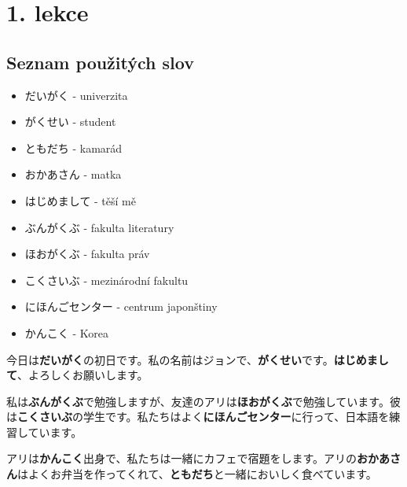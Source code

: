 \section{1. lekce}

\subsection*{Seznam použitých slov}

\begin{itemize}
    \item だいがく - univerzita
    \item がくせい - student
    \item ともだち - kamarád
    \item おかあさん - matka
    \item はじめまして - těší mě
    \item ぶんがくぶ - fakulta literatury
    \item ほおがくぶ - fakulta práv
    \item こくさいぶ - mezinárodní fakultu
    \item にほんごセンター - centrum japonštiny
    \item かんこく - Korea
\end{itemize}

今日は\textbf{だいがく}の初日です。私の名前はジョンで、\textbf{がくせい}です。\textbf{はじめまして}、よろしくお願いします。

私は\textbf{ぶんがくぶ}で勉強しますが、友達のアリは\textbf{ほおがくぶ}で勉強しています。彼は\textbf{こくさいぶ}の学生です。私たちはよく\textbf{にほんごセンター}に行って、日本語を練習しています。

アリは\textbf{かんこく}出身で、私たちは一緒にカフェで宿題をします。アリの\textbf{おかあさん}はよくお弁当を作ってくれて、\textbf{ともだち}と一緒においしく食べています。
